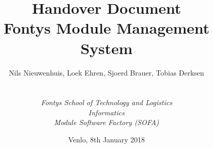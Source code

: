 

\def\Company{Fontys Sofa Group 1}
\def\Institute{\textit{Fontys School of Technology and Logistics}}
\def\Course{\textit{Informatics}}
\def\Module{\textit{Module Software Factory (SOFA)}}

\def\BoldTitle{Handover Document}
\def\Subtitle{Fontys Module Management System}
\def\Authors{Nils Nieuwenhuis, Loek Ehren, Sjoerd Brauer, Tobias Derksen}


\title{\textbf{\BoldTitle}\\\Subtitle}
\author{\Authors \\ \\ \\ \Institute\\ \Course\\ \Module}
\date{Venlo, 8th January 2018}
